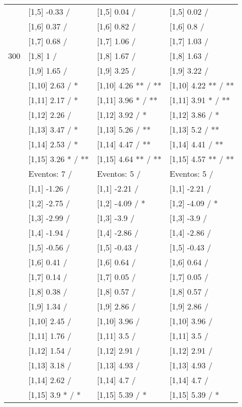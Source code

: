 \begin{table}
\begin{tabular}[t]{llll}
 & {}[1,5] -0.33  / & {}[1,5] 0.04  / & {}[1,5] 0.02  /\\
 & {}[1,6] 0.37  / & {}[1,6] 0.82  / & {}[1,6] 0.8  /\\
 & {}[1,7] 0.68  / & {}[1,7] 1.06  / & {}[1,7] 1.03  /\\
300 & {}[1,8] 1  / & {}[1,8] 1.67  / & {}[1,8] 1.63  /\\
\addlinespace
 & {}[1,9] 1.65  / & {}[1,9] 3.25  / & {}[1,9] 3.22  /\\
 & {}[1,10] 2.63  / * & {}[1,10] 4.26 ** / ** & {}[1,10] 4.22 ** / **\\
 & {}[1,11] 2.17  / * & {}[1,11] 3.96 * / ** & {}[1,11] 3.91 * / **\\
 & {}[1,12] 2.26  / & {}[1,12] 3.92  / * & {}[1,12] 3.86  / *\\
 & {}[1,13] 3.47  / * & {}[1,13] 5.26  / ** & {}[1,13] 5.2  / **\\
\addlinespace
 & {}[1,14] 2.53  / * & {}[1,14] 4.47  / ** & {}[1,14] 4.41  / **\\
 & {}[1,15] 3.26 * / ** & {}[1,15] 4.64 ** / ** & {}[1,15] 4.57 ** / **\\
 & Eventos:  7 / & Eventos:  5 / & Eventos:  5 /\\
 & {}[1,1] -1.26  / & {}[1,1] -2.21  / & {}[1,1] -2.21  /\\
 & {}[1,2] -2.75  / & {}[1,2] -4.09  / * & {}[1,2] -4.09  / *\\
\addlinespace
 & {}[1,3] -2.99  / & {}[1,3] -3.9  / & {}[1,3] -3.9  /\\
 & {}[1,4] -1.94  / & {}[1,4] -2.86  / & {}[1,4] -2.86  /\\
 & {}[1,5] -0.56  / & {}[1,5] -0.43  / & {}[1,5] -0.43  /\\
 & {}[1,6] 0.41  / & {}[1,6] 0.64  / & {}[1,6] 0.64  /\\
 & {}[1,7] 0.14  / & {}[1,7] 0.05  / & {}[1,7] 0.05  /\\
\addlinespace
500 & {}[1,8] 0.38  / & {}[1,8] 0.57  / & {}[1,8] 0.57  /\\
 & {}[1,9] 1.34  / & {}[1,9] 2.86  / & {}[1,9] 2.86  /\\
 & {}[1,10] 2.45  / & {}[1,10] 3.96  / & {}[1,10] 3.96  /\\
 & {}[1,11] 1.76  / & {}[1,11] 3.5  / & {}[1,11] 3.5  /\\
 & {}[1,12] 1.54  / & {}[1,12] 2.91  / & {}[1,12] 2.91  /\\
\addlinespace
 & {}[1,13] 3.18  / & {}[1,13] 4.93  / & {}[1,13] 4.93  /\\
 & {}[1,14] 2.62  / & {}[1,14] 4.7  / & {}[1,14] 4.7  /\\
 & {}[1,15] 3.9 * / * & {}[1,15] 5.39  / * & {}[1,15] 5.39  / *\\
\bottomrule
\end{tabular}
\end{table}
